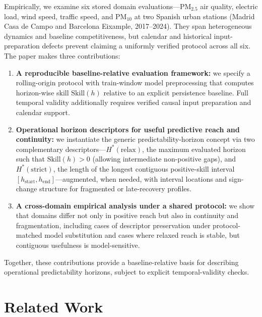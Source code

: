 \documentclass[pdflatex,sn-mathphys]{sn-jnl}
\begin{document}
Empirically, we examine six stored domain evaluations—PM$_{2.5}$ air quality, electric load, wind speed, traffic speed, and PM$_{10}$ at two Spanish urban stations (Madrid Casa de Campo and Barcelona Eixample, 2017–2024). They span heterogeneous dynamics and baseline competitiveness, but calendar and historical input-preparation defects prevent claiming a uniformly verified protocol across all six.
The paper makes three contributions:
\begin{enumerate}
  \item \textbf{A reproducible baseline-relative evaluation framework:} we specify a rolling-origin protocol with train-window model preprocessing that computes horizon-wise skill $\mathrm{Skill}(h)$ relative to an explicit persistence baseline. Full temporal validity additionally requires verified causal input preparation and calendar support.
  \item \textbf{Operational horizon descriptors for useful predictive reach and continuity:} we instantiate the generic predictability-horizon concept via two complementary descriptors—$H^*(\mathrm{relax})$, the maximum evaluated horizon such that $\mathrm{Skill}(h)>0$ (allowing intermediate non-positive gaps), and $H^*(\mathrm{strict})$, the length of the longest contiguous positive-skill interval $[h_{\mathrm{start}},h_{\mathrm{end}}]$—augmented, when needed, with interval locations and sign-change structure for fragmented or late-recovery profiles.
  \item \textbf{A cross-domain empirical analysis under a shared protocol:} we show that domains differ not only in positive reach but also in continuity and fragmentation, including cases of descriptor preservation under protocol-matched model substitution and cases where relaxed reach is stable, but contiguous usefulness is model-sensitive.
\end{enumerate}
Together, these contributions provide a baseline-relative basis for describing operational predictability horizons, subject to explicit temporal-validity checks.

\section{Related Work}
\end{document}
